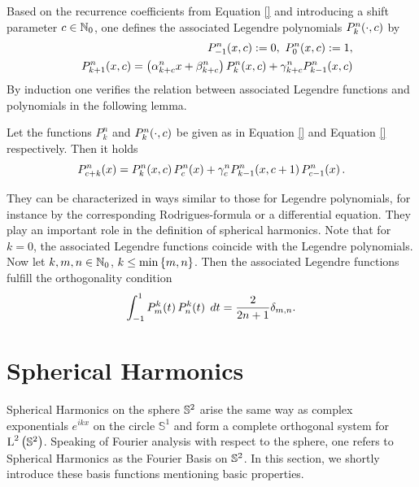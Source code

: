 Based on the recurrence coefficients from Equation \eqref{} and introducing a shift parameter $c \in \mathbb{N}_{0}$, one 
defines the associated Legendre polynomials $P_{k}^n{\hspace{-0.4ex}}\left(\cdot,c\right)$ by
\begin{eqnarray*}
  & & P_{-1}^n{\hspace{-0.4ex}}\left(x,c\right) := 0,\ P_{0}^n{\hspace{-0.4ex}}\left(x,c\right) := 1,\\
  & & P_{k+1}^n{\hspace{-0.4ex}}\left(x,c\right) = \left(\alpha_{k+c}^n x + \beta_{k+c}^n\right) P_{k}^n{\hspace{-0.4ex}}\left(x,c\right) + \gamma_{k+c}^n P_{k-1}^n{\hspace{-0.4ex}}\left(x,c\right)
\end{eqnarray*}
By induction one verifies the relation between associated Legendre functions and polynomials in the following lemma.
\begin{lemma}
  Let the functions $P_{k}^n$ and $P_{k}^n{\hspace{-0.4ex}}\left(\cdot,c\right)$ be given as in Equation \eqref{} and 
  Equation \eqref{} respectively. Then it holds
  $$ P_{c+k}^n{\hspace{-0.4ex}}\left(x\right) = P_{k}^n{\hspace{-0.4ex}}\left(x,c\right) P_{c}^n{\hspace{-0.4ex}}\left(x\right) + \gamma_{c}^n P_{k-1}^n{\hspace{-0.4ex}}\left(x,c+1\right) P_{c-1}^n{\hspace{-0.4ex}}\left(x\right). $$
\end{lemma}

\newpage

They can be characterized in ways similar
to those for Legendre polynomials, for instance by the
corresponding Rodrigues-formula or a differential equation. They
play an important role in the definition of spherical harmonics.
Note that for $k = 0$, the associated Legendre functions coincide with 
the Legendre polynomials.
Now let $k,m,n \in \mathbb{N}_0$, $k \le \min\left\{m,n\right\}$. Then the associated
Legendre functions fulfill the orthogonality condition
\begin{equation}
\nonumber
  \int_{-1}^{1} P_{m}^{k}{\hspace{-0.4ex}}\left(t\right) P_{n}^{k}{\hspace{-0.4ex}}\left(t\right)\;dt =
  \frac{2}{2n+1}\delta_{m,n}.
\end{equation}


\section{Spherical Harmonics}
\label{Basics:SphericalHarmonics}

Spherical Harmonics on the sphere $\mathbb{S}^2$ arise the same way as complex exponentials 
$e^{i k x}$ on the circle $\mathbb{S}^1$ and form a complete orthogonal system for $\text{\rm{L}}^{2}\left(\mathbb{S}^2\right)$.
Speaking of Fourier analysis with respect to the sphere, one refers to Spherical Harmonics as the Fourier 
Basis on $\mathbb{S}^2$. In this section, we shortly introduce these basis functions mentioning basic properties.


